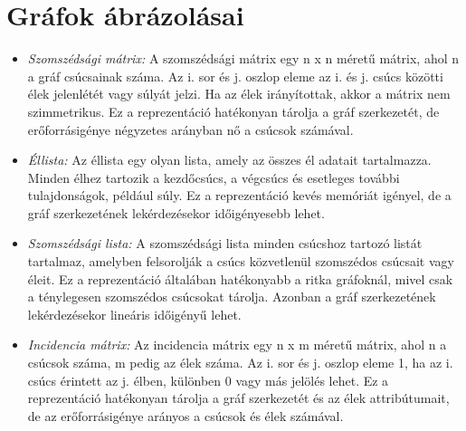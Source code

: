 \documentclass[margin=0px]{article}
\begin{document}
\section{Gráfok ábrázolásai}
\begin{itemize}
    \item \textit{Szomszédsági mátrix:} A szomszédsági mátrix egy n x n méretű mátrix, ahol n a gráf csúcsainak száma. Az i. sor és j. oszlop eleme az i. és j. csúcs közötti élek jelenlétét vagy súlyát jelzi. Ha az élek irányítottak, akkor a mátrix nem szimmetrikus. Ez a reprezentáció hatékonyan tárolja a gráf szerkezetét, de erőforrásigénye négyzetes arányban nő a csúcsok számával.
    \item \textit{Éllista:} Az éllista egy olyan lista, amely az összes él adatait tartalmazza. Minden élhez tartozik a kezdőcsúcs, a végcsúcs és esetleges további tulajdonságok, például súly. Ez a reprezentáció kevés memóriát igényel, de a gráf szerkezetének lekérdezésekor időigényesebb lehet.
    \item \textit{Szomszédsági lista:} A szomszédsági lista minden csúcshoz tartozó listát tartalmaz, amelyben felsorolják a csúcs közvetlenül szomszédos csúcsait vagy éleit. Ez a reprezentáció általában hatékonyabb a ritka gráfoknál, mivel csak a ténylegesen szomszédos csúcsokat tárolja. Azonban a gráf szerkezetének lekérdezésekor lineáris időigényű lehet.
    \item \textit{Incidencia mátrix:} Az incidencia mátrix egy n x m méretű mátrix, ahol n a csúcsok száma, m pedig az élek száma. Az i. sor és j. oszlop eleme 1, ha az i. csúcs érintett az j. élben, különben 0 vagy más jelölés lehet. Ez a reprezentáció hatékonyan tárolja a gráf szerkezetét és az élek attribútumait, de az erőforrásigénye arányos a csúcsok és élek számával.
\end{itemize}
    
\end{document}
